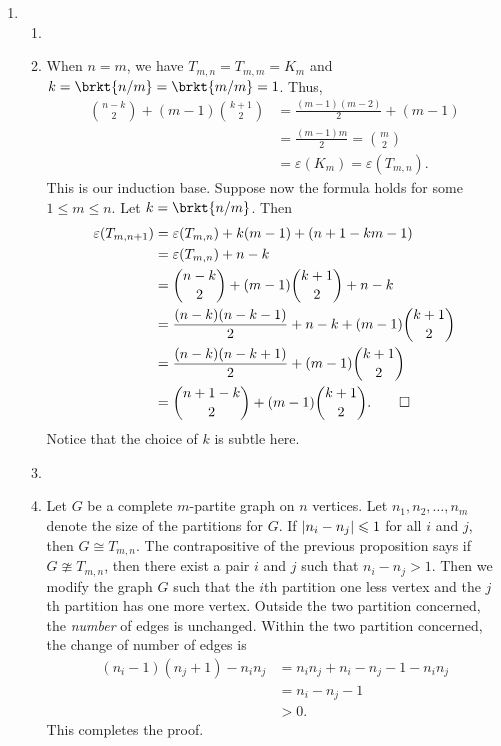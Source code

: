 \documentclass[a4paper]{book}
\makeatletter
\renewenvironment{proof}[1][\proofname]{\par
  \pushQED{\qed}%
  \normalfont \topsep6\p@\@plus6\p@\relax
  \trivlist
  \item[]\ignorespaces
}{%
  \popQED\endtrivlist\@endpefalse
}
\makeatother
\begin{document}
\begin{enumerate}
\item
  \begin{enumerate}
  \item
    \begin{proof}
      When \(n = m\), we have \(T_{m,n} = T_{m,m} = K_m\) and \(k = \brkt{n/m} = \brkt{m/m} = 1\).  Thus, 
      \begin{align*}
        \binom{n-k}{2} + (m-1) \binom{k+1}{2}
          &= \frac{(m-1)(m-2)}{2} + (m-1) \\
          &= \frac{(m-1)m}{2}
            = \binom{m}{2} \\
          &= \varepsilon(K_m)
            = \varepsilon(T_{m,n}).
      \end{align*}
      This is our induction base.  Suppose now the formula holds for
      some \(1 \le m \le n\).  Let \(k = \brkt{n/m}\).  Then
      \begin{align*}
        \varepsilon(T_{m,n+1})
          &= \varepsilon(T_{m,n}) + k(m-1) + (n+1 - km -1) \\
          &= \varepsilon(T_{m,n}) + n - k \\
          &= \binom{n-k}{2} + (m-1) \binom{k+1}{2} + n - k \\
          &= \frac{(n-k)(n-k-1)}{2} + n - k + (m-1) \binom{k+1}{2} \\
          &= \frac{(n-k)(n-k+1)}{2} + (m-1) \binom{k+1}{2} \\
          &= \binom{n+1-k}{2} + (m-1) \binom{k+1}{2}. \qedhere
      \end{align*}
      Notice that the choice of \(k\) is subtle here.
    \end{proof}
  \item
    \begin{proof}
      Let \(G\) be a complete \(m\)-partite graph on \(n\) vertices.
      Let \(n_1, n_2, \dotsc, n_m\) denote the size of the partitions
      for \(G\).  If \(\abs{n_i - n_j} \le 1\) for all \(i\) and \(j\),
      then \(G \cong T_{m,n}\).  The contrapositive of the previous
      proposition says if \(G \ncong T_{m,n}\), then there exist a pair
      \(i\) and \(j\) such that \(n_i - n_j > 1\).  Then we modify the
      graph \(G\) such that the \(i\)th partition one less vertex and
      the \(j\)th partition has one more vertex.  Outside the two
      partition concerned, the \emph{number} of edges is unchanged.
      Within the two partition concerned, the change of number of edges
      is
      \begin{align*}
        (n_i - 1)(n_j + 1) - n_i n_j
          &= n_i n_j + n_i - n_j - 1 - n_i n_j \\
          &= n_i - n_j - 1 \\
          &> 0.
      \end{align*}
      This completes the proof.
  \end{proof}
  \end{enumerate}
\end{enumerate}

\newpage
\null
\end{document}
